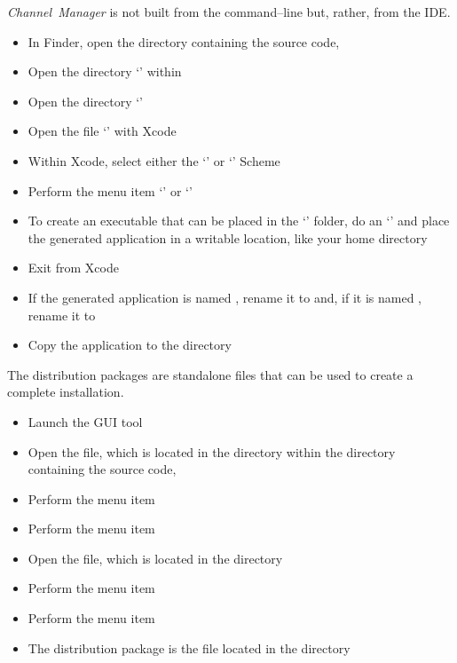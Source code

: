 \TBD{}
\tertiaryEnd{}
\secondaryEnd{}
\textit{Channel~Manager} is not built from the command--line but, rather, from the IDE.
\begin{itemize}
\item In Finder, open the directory containing the \mplusm source code, 
\item Open the directory `' within
\item Open the directory `'
\item Open the file `' with Xcode
\item Within Xcode, select either the `' or
`' Scheme
\item Perform the menu item `' or
`'
\item To create an executable that can be placed in the `' folder,
do an `'
and place the generated application in a writable location, like your home directory
\item Exit from Xcode
\item If the generated application is named , rename it to
 and, if it is named , rename it
to 
\item Copy the  application to the 
directory
\end{itemize}
\tertiaryEnd{}
\TBD{}
\tertiaryEnd{}
\TBD{}
\tertiaryEnd{}
\secondaryEnd{}
The distribution packages are standalone files that can be used to create a complete
\mplusm{} installation.
\begin{itemize}
\item Launch the  GUI tool
\item Open the  file, which is located in the
 directory within the directory containing the \mplusm{} source
code, 
\item Perform the menu item 
\item Perform the menu item 
\item Open the  file, which is located in the  directory
\item Perform the menu item 
\item Perform the menu item 
\item The distribution package is the  file located in the
 directory
\end{itemize}
\tertiaryEnd{}
\TBD{}
\tertiaryEnd{}
\TBD{}
\tertiaryEnd{}
\secondaryEnd{}
\appendixEnd{}
